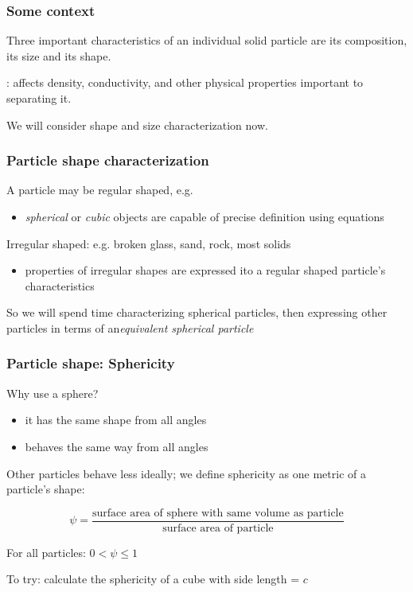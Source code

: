 \begin{frame}\frametitle{Some context}
	\begin{exampleblock}{}
		Three important characteristics of an individual solid particle are its composition, its size and its shape.
	\end{exampleblock}

	\vspace{12pt}
	{\color{myGreen}{Composition}}: affects density, conductivity, and other physical properties important to separating it.
	
	\vspace{24pt}
	We will consider shape and size characterization now.
	
\end{frame}

\begin{frame}\frametitle{Particle shape characterization}

	A particle may be regular shaped, e.g.
	\begin{itemize}
		\item	\emph{spherical} or \emph{cubic} objects are capable of precise definition using equations
	\end{itemize}

	\vspace{12pt}
	Irregular shaped: e.g. broken glass, sand, rock, most solids
	\begin{itemize}
		\item	properties of irregular shapes are expressed ito a regular shaped particle's characteristics
	\end{itemize}
	
	\vspace{12pt}
	So we will spend time characterizing spherical particles, then expressing other particles in terms of an\emph{equivalent spherical particle}
\end{frame}

\begin{frame}\frametitle{Particle shape: Sphericity}
	Why use a sphere?
	\begin{itemize}
		\item	it has the same shape from all angles
		\item	behaves the same way from all angles
	\end{itemize}

	Other particles behave less ideally; we define sphericity as one metric of a particle's shape:


	\[
		\psi = \frac{\text{surface area of sphere with same volume as particle}}{\text{surface area of particle}}
	\]

	\vspace{12pt}
	For all particles: \( 0 < \psi \leq 1 \)

	\vspace{12pt}
	To try: calculate the sphericity of a cube with side length = $c$ \\ {\scriptsize {\color{myGreen}{Answer: $\psi = 0.806$}}}
\end{frame}

